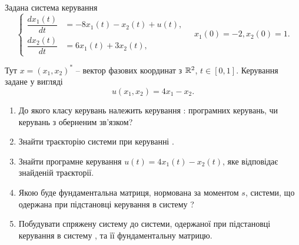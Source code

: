 \begin{problem}
	Задана система керування 
	\begin{equation}
		\label{eq:1.5}
		\left\{
			\begin{aligned}
				\dfrac{dx_1(t)}{dt} &= -8x_1(t)  -x_2(t) + u(t),\\
				\dfrac{dx_2(t)}{dt} &= 6x_1(t) + 3x_2(t),
			\end{aligned}
		\right.
		\quad
		x_1(0) = -2, x_2(0) = 1.
	\end{equation}

	Тут $ x =(x_1, x_2)^*$ -- вектор фазових координат з $\mathbb{R}^2$, $t \in [0, 1]$. Керування задане у вигляді
	\begin{equation}
		\label{eq:1.6}
		u(x_1, x_2) = 4x_1 - x_2.
	\end{equation}

	\begin{enumerate}
		\item До якого класу керувань належить керування : програмних керувань, чи керувань з оберненим зв'язком?
		\item Знайти траєкторію системи при керуванні .
		\item Знайти програмне керування $u(t) = 4x_1(t) - x_2(t)$, яке відповідає знайденій траєкторії.
		\item Якою буде фундаментальна матриця, нормована за моментом $s$, системи, що одержана при підстановці керування  в систему ?
		\item Побудувати спряжену систему до системи, одержаної при підстановці керування  в систему , та її фундаментальну матрицю.
	\end{enumerate}
\end{problem}

